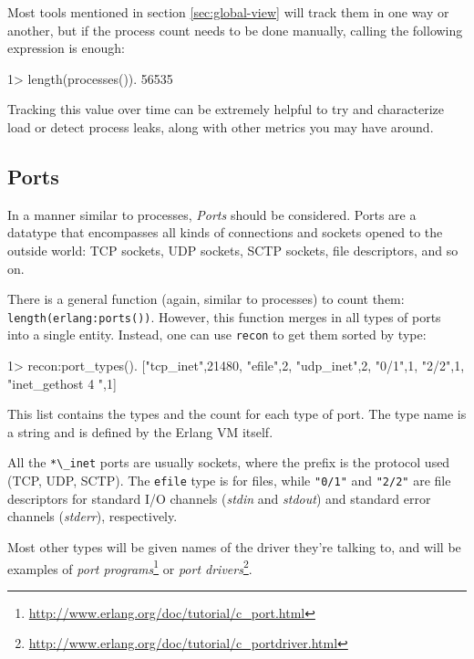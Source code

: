 \documentclass[11pt, oneside]{book}   	%
\newcommand{\otpapp}[1]{\Verb`#1`}
\newcommand{\expression}[1]{\Verb`#1`}
\begin{document}
Most tools mentioned in section \ref{sec:global-view} will track them in one way or another, but if the process count needs to be done manually, calling the following expression is enough:

\begin{VerbatimEshell}
1> length(processes()).
56535
\end{VerbatimEshell}

Tracking this value over time can be extremely helpful to try and characterize load or detect process leaks, along with other metrics you may have around.

\subsection{Ports}
\label{subsec:global-ports}

In a manner similar to processes, \emph{Ports} should be considered. Ports are a datatype that encompasses all kinds of connections and sockets opened to the outside world: TCP sockets, UDP sockets, SCTP sockets, file descriptors, and so on.

There is a general function (again, similar to processes) to count them: \expression{length(erlang:ports())}. However, this function merges in all types of ports into a single entity. Instead, one can use \otpapp{recon} to get them sorted by type:

\begin{VerbatimEshell}
1> recon:port_types().
[{"tcp_inet",21480},
 {"efile",2},
 {"udp_inet",2},
 {"0/1",1},
 {"2/2",1},
 {"inet_gethost 4 ",1}]
 \end{VerbatimEshell}

This list contains the types and the count for each type of port. The type name is a string and is defined by the Erlang VM itself.

All the \expression{*\_inet} ports are usually sockets, where the prefix is the protocol used (TCP, UDP, SCTP). The \expression{efile} type is for files, while \expression{"0/1"} and \expression{"2/2"} are file descriptors for standard I/O channels (\emph{stdin} and \emph{stdout}) and standard error channels (\emph{stderr}), respectively.

Most other types will be given names of the driver they're talking to, and will be examples of \emph{port programs}\footnote{\href{http://www.erlang.org/doc/tutorial/c\_port.html}{http://www.erlang.org/doc/tutorial/c\_port.html}} or \emph{port drivers}\footnote{\href{http://www.erlang.org/doc/tutorial/c\_portdriver.html}{http://www.erlang.org/doc/tutorial/c\_portdriver.html}}.
\end{document}
